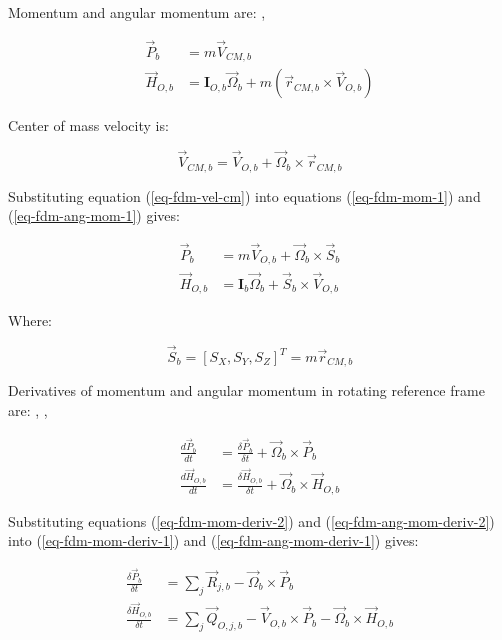 Momentum and angular momentum are: \cite{Osinski1997}, \cite{Leyko2002}

\begin{align}
  \label{eq-fdm-mom-1} 
  {\vec P}_b
  &=
  m {\vec V}_{CM,b} \\
  \label{eq-fdm-ang-mom-1}
  {\vec H}_{O,b}
  &=
  {\boldsymbol I}_{O,b} {\vec \Omega}_b
  +
  m \left( {\vec r}_{CM,b}
  \times
  {\vec V}_{O,b} \right)
\end{align}

Center of mass velocity is:

\begin{equation}
  \label{eq-fdm-vel-cm}
  {\vec V}_{CM,b}
  =
  {\vec V}_{O,b} + {\vec \Omega}_b \times {\vec r}_{CM,b}
\end{equation}

Substituting equation (\ref{eq-fdm-vel-cm}) into equations (\ref{eq-fdm-mom-1}) and (\ref{eq-fdm-ang-mom-1}) gives:

\begin{align}
  \label{eq-fdm-mom-2} 
  {\vec P}_b
  &=
  m {\vec V}_{O,b} + {\vec \Omega}_b
  \times
  {\vec S}_b \\
  \label{eq-fdm-ang-mom-2}
  {\vec H}_{O,b}
  &=
  {\boldsymbol I}_b {\vec \Omega}_b
  +
  {\vec S}_b \times {\vec V}_{O,b}
\end{align}

Where:

\begin{equation}
  {\vec S}_b = \left[ S_X, S_Y, S_Z \right]^T = m {\vec r}_{CM,b}
\end{equation}

Derivatives of momentum and angular momentum in rotating reference frame are: \cite{Taylor2005}, \cite{Osinski1997}, \cite{Leyko2002}

\begin{align}
  \label{eq-fdm-mom-deriv-2} 
  \frac{d {\vec P}_b}{dt}
  &=
  \frac{\delta {\vec P}_b}{\delta t}
  +
  {\vec \Omega}_b \times {\vec P}_b \\
  \label{eq-fdm-ang-mom-deriv-2}
  \frac{d {\vec H}_{O,b}}{dt}
  &=
  \frac{\delta {\vec H}_{O,b}}{\delta t}
  +
  {\vec \Omega}_b \times {\vec H}_{O,b}
\end{align}

Substituting equations (\ref{eq-fdm-mom-deriv-2}) and (\ref{eq-fdm-ang-mom-deriv-2}) into (\ref{eq-fdm-mom-deriv-1}) and (\ref{eq-fdm-ang-mom-deriv-1}) gives:

\begin{align}
  \label{eq-fdm-mom-deriv-3}
  \frac{\delta {\vec P}_b}{\delta t}
  &=
  \sum_{j} {\vec R}_{j,b}
  -
  {\vec \Omega}_b \times {\vec P}_b \\
  \label{eq-fdm-ang-mom-deriv-3}
  \frac{\delta {\vec H}_{O,b}}{\delta t}
  &=
  \sum_{j} {\vec Q}_{O,j,b}
  -
  {\vec V}_{O,b} \times {\vec P}_b
  -
  {\vec \Omega}_b \times {\vec H}_{O,b}
\end{align}


